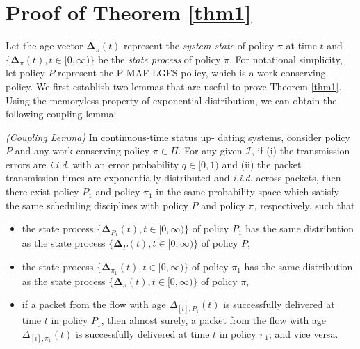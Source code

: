 \appendices

\section{Proof of Theorem \ref{thm1}}\label{app1}
Let the age vector $\bm\Delta_{\pi}(t)$ represent the \emph{system state} of policy $\pi$ at time $t$ and $\{\bm\Delta_{\pi}(t),t\in [0,\infty)\}$ be the \emph{state process} of policy $\pi$. For notational simplicity, let policy $P$ represent the P-MAF-LGFS policy, which is a work-conserving policy. We first establish two lemmas that are useful to prove Theorem \ref{thm1}. 
Using
the memoryless property of exponential distribution, we can
obtain the following coupling lemma:
\begin{lemma}\emph{(Coupling Lemma)}\label{coupling}
In continuous-time status up- dating systems, consider policy $P$ and any {work-conserving} policy $\pi\in \Pi$. For any given $\mathcal{I}$, if (i) the transmission errors are \emph{i.i.d.} with an error probability $q\in [0,1)$ and (ii)  the packet transmission times are exponentially distributed and \emph{i.i.d.} across  packets,
 then there exist policy $P_1$ and  policy $\pi_1$ in the same probability space which satisfy the same scheduling disciplines with policy $P$ and policy $\pi$, respectively,  such that 
\begin{itemize}
\itemsep0em 
\item[1.] the state process $\{\bm\Delta_{P_1}(t),t\in [0,\infty)\}$ of policy $P_1$ has the same distribution as the state process $\{\bm\Delta_{P}(t),t\in [0,\infty)\}$ of policy $P$,
\item[2.] the state process $\{\bm\Delta_{\pi_1}(t),t\in [0,\infty)\}$ of policy $\pi_1$ has the same distribution as the state process $\{\bm\Delta_{\pi}(t),t\in [0,\infty)\}$  of policy $\pi$,
\item[3.] if a packet from the flow with age $\Delta_{[i],P_1}(t)$ is successfully delivered at time $t$ in policy $P_1$, then almost surely, a packet from the flow with age $\Delta_{[i],\pi_1}(t)$ is successfully delivered at time $t$ in policy $\pi_1$; and vice versa.
\end{itemize} 
\end{lemma}
\ifreport
